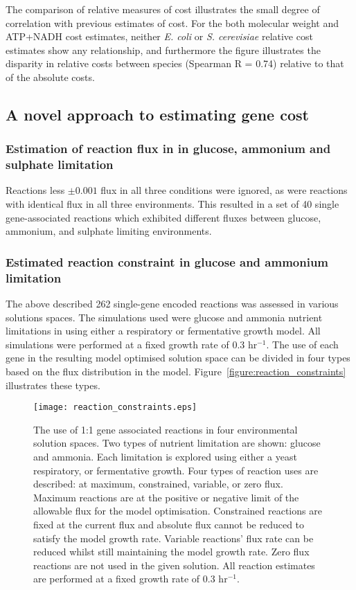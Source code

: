The comparison of relative measures of cost illustrates the small degree of correlation with previous estimates of cost. For the both molecular weight and ATP+NADH cost estimates, neither \emph{E. coli} or \emph{S. cerevisiae} relative cost estimates show any relationship, and furthermore the figure illustrates the disparity in relative costs between species (Spearman R = 0.74) relative to that of the absolute costs.

\subsection{A novel approach to estimating gene cost}%


\subsubsection{Estimation of reaction flux in in glucose, ammonium and sulphate limitation}%

Reactions less $\pm0.001$ flux in all three conditions were ignored, as were reactions with identical flux in all three environments. This resulted in a set of 40 single gene-associated reactions which exhibited different fluxes between glucose, ammonium, and sulphate limiting environments.

\subsubsection{Estimated reaction constraint in glucose and ammonium limitation}%

The above described 262 single-gene encoded reactions was assessed in various solutions spaces. The simulations used were glucose and ammonia nutrient limitations in using either a respiratory or fermentative growth model. All simulations were performed at a fixed growth rate of 0.3 hr$^{-1}$. The use of each gene in the resulting model optimised solution space can be divided in four types based on the flux distribution in the model. Figure~\vref{figure:reaction_constraints} illustrates these types.

\begin{figure}%
\centering
\texttt{[image: reaction\_constraints.eps]}
\caption[Gene use in model optimised solution space]{The use of 1:1 gene associated reactions in four environmental solution spaces. Two types of nutrient limitation are shown: glucose and ammonia. Each limitation is explored using either a yeast respiratory, or fermentative growth. Four types of reaction uses are described: at maximum, constrained, variable, or zero flux. Maximum reactions are at the positive or negative limit of the allowable flux for the model optimisation. Constrained reactions are fixed at the current flux and absolute flux cannot be reduced to satisfy the model growth rate. Variable reactions' flux rate can be reduced whilst still maintaining the model growth rate. Zero flux reactions are not used in the given solution. All reaction estimates are performed at a fixed growth rate of 0.3 hr$^{-1}$. }
\label{figure:reaction_constraints}
\end{figure}%

